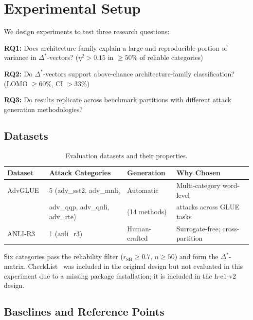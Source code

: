 \section{Experimental Setup}
\label{sec:setup}

We design experiments to test three research questions:

\textbf{RQ1:} Does architecture family explain a large and reproducible portion of variance in
$\Delta^*$-vectors? ($\eta^2>0.15$ in $\geq 50\%$ of reliable categories)

\textbf{RQ2:} Do $\Delta^*$-vectors support above-chance architecture-family classification?
(LOMO $\geq 60\%$, CI $> 33\%$)

\textbf{RQ3:} Do results replicate across benchmark partitions with different attack generation
methodologies?

\subsection{Datasets}

\begin{table}[h]
\centering
\caption{Evaluation datasets and their properties.}
\begin{tabular}{llll}
\toprule
\textbf{Dataset} & \textbf{Attack Categories} & \textbf{Generation} & \textbf{Why Chosen} \\
\midrule
AdvGLUE~\citep{Wang2021Adversarial} & 5 (adv\_sst2, adv\_mnli, & Automatic & Multi-category word-level \\
                                     & adv\_qqp, adv\_qnli, adv\_rte) & (14 methods) & attacks across GLUE tasks \\
ANLI-R3~\citep{Nie2020Adversarial} & 1 (anli\_r3) & Human-crafted & Surrogate-free; cross-partition \\
\bottomrule
\end{tabular}
\end{table}

Six categories pass the reliability filter ($r_\text{SB} \geq 0.7$, $n \geq 50$) and form the
$\Delta^*$-matrix. CheckList~\citep{Ribeiro2020Beyond} was included in the original design but
not evaluated in this experiment due to a missing package installation; it is included in the
h-e1-v2 design.

\subsection{Baselines and Reference Points}

